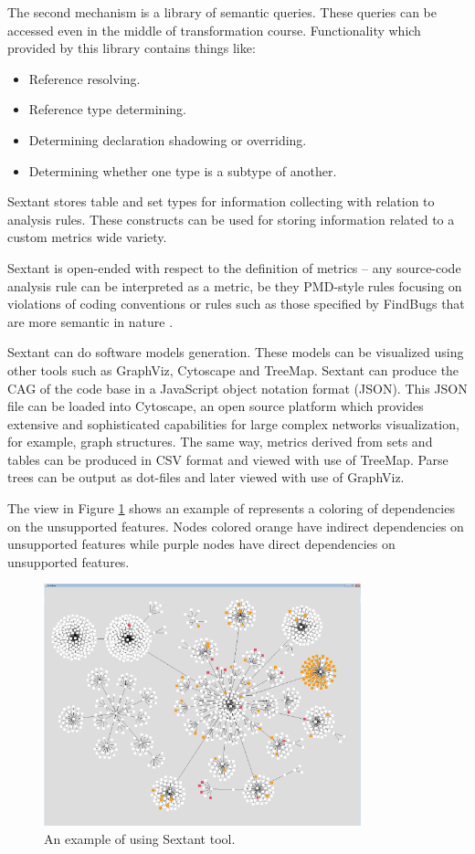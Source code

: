 The second mechanism is a library of semantic queries. These queries can be accessed even in the middle of transformation course. Functionality which provided by this library contains things like:
\begin{itemize}
	\item Reference resolving.
	\item Reference type determining.
	\item Determining declaration shadowing or overriding.
	\item Determining whether one type is a subtype of another.
\end{itemize}
 
Sextant stores table and set types for information collecting with relation to analysis rules. These constructs can be used for storing information related to a custom metrics wide variety.

Sextant is open-ended with respect to the definition of metrics – any source-code analysis rule can be interpreted as a metric, be they PMD-style rules focusing on violations of coding conventions or rules such as those specified by FindBugs that are more semantic in nature \cite{sextant}.

Sextant can do software models generation. These models can be visualized using other tools such as GraphViz, Cytoscape and TreeMap. Sextant can produce the CAG of the code base in a JavaScript object notation format (JSON). This JSON file can be loaded into Cytoscape, an open source platform which provides extensive and sophisticated capabilities for large complex networks visualization, for example, graph structures. The same way, metrics derived from sets and tables can be produced in CSV format and viewed with use of TreeMap. Parse trees can be output as dot-files and later viewed with use of GraphViz.

The view in Figure \ref{fig:1} shows an example of represents a coloring of dependencies on the unsupported features. Nodes colored orange have indirect dependencies on unsupported features while purple nodes have direct dependencies on unsupported features.

\begin{figure}[h]
	\centering
	\includegraphics[height=70mm]{figures/1.png}
	\caption{An example of using Sextant tool.}
	\label{fig:1}
\end{figure}


